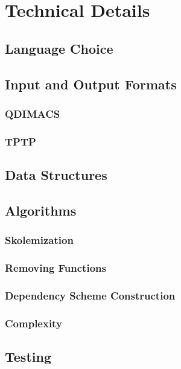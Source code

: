 \chapter{Technical Details}

\section{Language Choice}

\section{Input and Output Formats}
\subsection{QDIMACS}
\subsection{TPTP}

\section{Data Structures}

\section{Algorithms}
\subsection{Skolemization}
\subsection{Removing Functions}
\subsection{Dependency Scheme Construction}
\subsection{Complexity}

\section{Testing}
